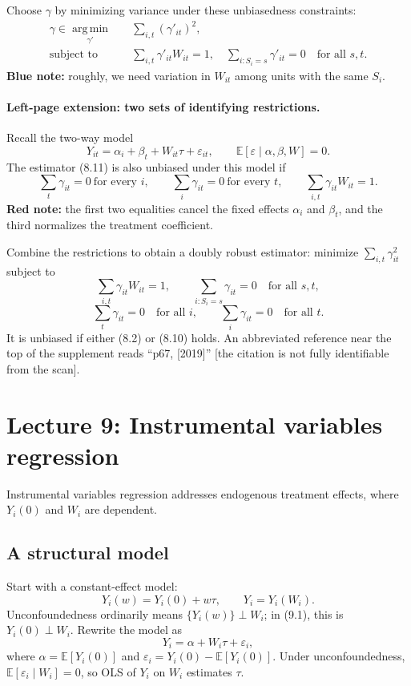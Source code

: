 Choose $\gamma$ by minimizing variance under these unbiasedness constraints:
\begin{align*}
 \gamma\in\operatorname*{arg\,min}_{\gamma'}\quad&\sum_{i,t}(\gamma'_{it})^2,\\
 \text{subject to}\quad&\sum_{i,t}\gamma'_{it}W_{it}=1,
 \quad\sum_{i:S_i=s}\gamma'_{it}=0\quad\text{for all }s,t.\tag{8.14}
\end{align*}
\textbf{Blue note:} roughly, we need variation in $W_{it}$ among units with the same $S_i$.

\paragraph{Left-page extension: two sets of identifying restrictions.}
Recall the two-way model
\[
 Y_{it}=\alpha_i+\beta_t+W_{it}\tau+\varepsilon_{it},
 \qquad\mathbb E[\varepsilon\mid\alpha,\beta,W]=0.\tag{8.2, recalled}
\]
The estimator (8.11) is also unbiased under this model if
\[
 \sum_t\gamma_{it}=0\ \text{for every }i,
 \qquad\sum_i\gamma_{it}=0\ \text{for every }t,
 \qquad\sum_{i,t}\gamma_{it}W_{it}=1.
\]
\textbf{Red note:} the first two equalities cancel the fixed effects $\alpha_i$ and $\beta_t$, and the third normalizes the treatment coefficient.

Combine the restrictions to obtain a doubly robust estimator: minimize $\sum_{i,t}\gamma_{it}^2$ subject to
\[
 \sum_{i,t}\gamma_{it}W_{it}=1,
 \qquad\sum_{i:S_i=s}\gamma_{it}=0\quad\text{for all }s,t,
\]
\[
 \sum_t\gamma_{it}=0\quad\text{for all }i,
 \qquad\sum_i\gamma_{it}=0\quad\text{for all }t.
\]
It is unbiased if either (8.2) or (8.10) holds. An abbreviated reference near the top of the supplement reads ``p67, [2019]'' [the citation is not fully identifiable from the scan].

\section{Lecture 9: Instrumental variables regression}
Instrumental variables regression addresses endogenous treatment effects, where $Y_i(0)$ and $W_i$ are dependent.

\subsection{A structural model}
Start with a constant-effect model:
\[
 Y_i(w)=Y_i(0)+w\tau,\qquad Y_i=Y_i(W_i).\tag{9.1}
\]
Unconfoundedness ordinarily means $\{Y_i(w)\}\perp W_i$; in (9.1), this is $Y_i(0)\perp W_i$. Rewrite the model as
\[
 Y_i=\alpha+W_i\tau+\varepsilon_i,\tag{9.2}
\]
where $\alpha=\mathbb E[Y_i(0)]$ and $\varepsilon_i=Y_i(0)-\mathbb E[Y_i(0)]$. Under unconfoundedness, $\mathbb E[\varepsilon_i\mid W_i]=0$, so OLS of $Y_i$ on $W_i$ estimates $\tau$.

